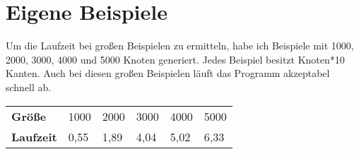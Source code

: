 \section {Eigene Beispiele}
Um die Laufzeit bei großen Beispielen zu ermitteln, habe ich Beispiele mit 1000, 2000, 3000, 4000 und 5000 Knoten generiert. Jedes Beispiel besitzt Knoten*10 Kanten. Auch bei diesen großen Beispielen läuft das Programm akzeptabel schnell ab. 
\begin{table} [!h]
    \centering
    \begin{tabular}{l|lllll}
    \textbf{Größe}    & 1000 & 2000 & 3000 & 4000 & 5000 \\
    \textbf{Laufzeit} & 0,55 & 1,89 & 4,04 & 5,02 & 6,33 \\
    \end{tabular}
\end{table}
